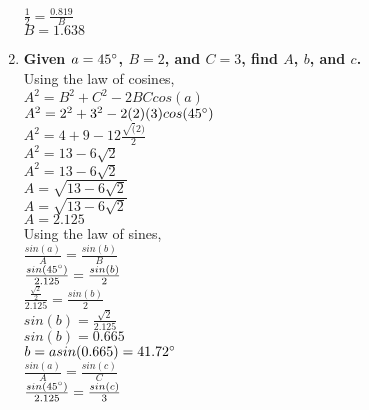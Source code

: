 \begin{enumerate}
\tab \tab $\frac{1}{2} = \frac{0.819}{B}$\\

\tab \tab $B =1.638$\\

\item{\bf Given $a=45^\circ$, $B=2$, and $C=3$, find $A$, $b$, and $c$.}\\

\tab \tab Using the law of cosines,\\

\tab \tab $A^2 = B^2 + C^2 - 2BCcos(a)$\\

\tab \tab $A^2 = 2^2 + 3^2 -2(2)(3)cos(45^\circ)$\\

\tab \tab $A^2 = 4 + 9 -12\frac{\sqrt(2)}{2}$\\

\tab \tab $A^2 = 13 - 6\sqrt{2}$\\

\tab \tab $A^2 = 13 - 6\sqrt{2}$\\

\tab \tab $A = \sqrt{13 - 6\sqrt{2}}$\\

\tab \tab $A = \sqrt{13 - 6\sqrt{2}}$\\

\tab \tab $A = 2.125$\\

\tab \tab Using the law of sines,\\

\tab \tab $\frac{sin(a)}{A} = \frac{sin(b)}{B}$\\

\tab \tab $\frac{sin(45^\circ)}{2.125} = \frac{sin(b)}{2}$\\

\tab \tab $\frac{\frac{\sqrt{2}}{2}}{2.125} = \frac{sin(b)}{2}$\\

\tab \tab $sin(b) = \frac{\sqrt{2}}{2.125}$\\

\tab \tab $sin(b) = 0.665$\\

\tab \tab $b = asin(0.665) = 41.72^\circ$\\

\tab \tab $\frac{sin(a)}{A} = \frac{sin(c)}{C}$\\

\tab \tab $\frac{sin(45^\circ)}{2.125} = \frac{sin(c)}{3}$\\


\end{enumerate}
